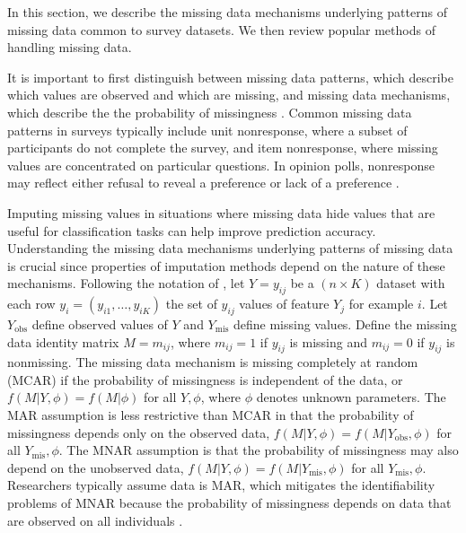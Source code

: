 \documentclass[10pt]{book}
\theoremstyle{definition}
\begin{document}
\lhead[\footnotesize\thepage\fancyplain{}\leftmark]{}\rhead[]{\fancyplain{}\rightmark\footnotesize\thepage}%

\setcounter{chapter}{2}
\setcounter{equation}{0} %

In this section, we describe the missing data mechanisms underlying patterns of missing data common to survey datasets. We then review popular methods of handling missing data.

\par
{}

It is important to first distinguish between missing data patterns, which describe which values are observed and which are missing, and missing data mechanisms, which describe the the probability of missingness  \citep[Chap.~1]{little2014}. Common missing data patterns in surveys typically include unit nonresponse, where a subset of participants do not complete the survey, and item nonresponse, where missing values are concentrated on particular questions. In opinion polls, nonresponse may reflect either refusal to reveal a preference or lack of a preference \citep{de2003prevention}. 

Imputing missing values in situations where missing data hide values that are useful for classification tasks can help improve prediction accuracy. Understanding the missing data mechanisms underlying patterns of missing data is crucial since properties of imputation methods depend on the nature of these mechanisms. Following the notation of \citet[Chap.~1]{little2014}, let $Y = y_{ij}$ be a $(n \times K)$ dataset with each row $y_i = (y_{i1}, \ldots, y_{iK})$ the set of $y_{ij}$ values of feature $Y_j$ for example $i$. Let $Y_{\mathrm{obs}}$ define observed values of $Y$ and $Y_{\mathrm{mis}}$ define missing values. Define the missing data identity matrix $M = m_{ij}$, where $m_{ij} = 1$ if $y_{ij}$ is missing and $m_{ij} = 0$ if $y_{ij}$ is nonmissing. The missing data mechanism is missing completely at random (MCAR) if the probability of missingness is independent of the data, or $f(M | Y, \phi) = f(M | \phi)$ for all $Y, \phi$, where $\phi$ denotes unknown parameters. The MAR assumption is less restrictive than MCAR in that the probability of missingness depends only on the observed data, $f(M | Y, \phi) = f(M | Y_{\mathrm{obs}}, \phi)$ for all $Y_{\mathrm{mis}}, \phi$. The MNAR assumption is that the probability of missingness may also depend on the unobserved data, $f(M | Y, \phi) = f(M | Y_{\mathrm{mis}}, \phi)$ for all $Y_{\mathrm{mis}}, \phi$. Researchers typically assume data is MAR, which mitigates the identifiability problems of MNAR because the probability of missingness depends on data that are observed on all individuals \citep[Chap.~6]{tsiatis2007}. 
\end{document}
